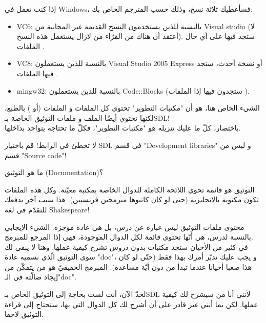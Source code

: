 إذا كنت تعمل في 
\textenglish{Windows}،
فسأعطيك ثلاثة نسخ، وذلك حسب المترجم الخاص بك:

\begin{itemize}
	\item \textenglish{VC6}:
	بالنسبة للذين يستخدمون النسخ القديمة غير المجانية من
	\textenglish{Visual studio}
	(لا أعتقد أن هناك من القرّاء من لازال يستعمل هذه النسخ). ستجد فيها على أي حال الملفات
	.
	\item \textenglish{VC8}:
	 بالنسبة للذين يستعملون 
	\textenglish{Visual Studio 2005 Express}
	أو نسخة أحدث، ستجد فيها الملفات
	.
	\item \textenglish{mingw32}:
	بالنسبة للذين يستعملون 
	\textenglish{Code::Blocks}
	(ستجدون فيها إذا الملفات
	).
\end{itemize}

الشيء الخاص هنا، هو أن "مكتبات التطوير" تحتوي كل الملفات
و الملفات
(أو
)
بالطبع، لكنها تحتوي أيضًا الملف 
و ملفات التوثيق الخاصة بـ\textenglish{SDL}!\\
باختصار، كلّ ما عليك تنزيله هو "مكتبات التطوير"، فكلّ ما تحتاجه يتواجد بداخلها.

\begin{critical}
لا تخطئ في الرابط! قم باختيار \textenglish{SDL}
في قسم
"\textenglish{Development libraries}"
و ليس من قسم
"\textenglish{Source code}"!
\end{critical}

\begin{question}
ما هو التوثيق 
(\textenglish{Documentation})؟
\end{question}

التوثيق هو قائمة تحوي اللائحة الكاملة للدوال الخاصة بمكتبة معيّنة. وكل هذه الملفات تكون مكتوبة بالانجليزية (حتى لو كان كاتبوها مبرمجين فرنسيين). هذا سبب آخر يدفعك للتقدّم في لغة
\textenglish{Shakespeare}!

محتوى ملفات التوثيق  ليس عبارة عن درس، بل هي عادة موجزة. الشيء الإيجابي بالنسبة لدرس، هي أنّها تحتوي قائمة لكل الدوال الموجودة،  فهي إذا المرجع للمبرمج.\\
في كثير من الأحيان ستجد مكتبات بدون دروس تشرح كيفية عملها. وهنا لا يبقى لك سوى التوثيق الّذي نسميه عادة
"\textenglish{doc}"،
و يجب عليك تدبّر أمرك بهذا فقط (حتّى لو كان هذا صعبا أحيانا عندما تبدأ من دون أيّة مساعدة). المبرمج الحقيقيّ هو من يتمكّن من إيجاد ضالّته في الـ"\textenglish{doc}".

لحدّ الآن، أنت لست بحاجة إلى التوثيق الخاص بـ\textenglish{SDL}
لأنني أنا من سيشرح لك كيفية عملها. لكن بما أنني غير قادر على أن أشرح لك كل الدوال التي بها، ستحتاج إلى قراءة التوثيق لاحقا. 


